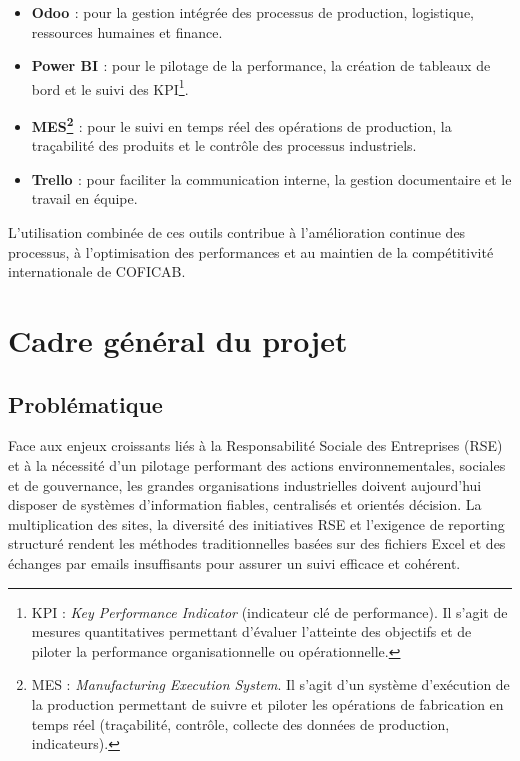 \begin{itemize}[label=\textbullet]
  \item \textbf{Odoo \cite{odoo-docs}} : pour la gestion intégrée des processus de production, logistique, ressources humaines et finance.
  \item \textbf{Power BI \cite{powerbi-docs}} : pour le pilotage de la performance, la création de tableaux de bord et le suivi des KPI\footnote{KPI : \emph{Key Performance Indicator} (indicateur clé de performance). Il s’agit de mesures quantitatives permettant d’évaluer l’atteinte des objectifs et de piloter la performance organisationnelle ou opérationnelle.}.
  \item \textbf{MES\footnote{MES : \emph{Manufacturing Execution System}. Il s’agit d’un système d’exécution de la production permettant de suivre et piloter les opérations de fabrication en temps réel (traçabilité, contrôle, collecte des données de production, indicateurs).} \cite{mes-docs}} : pour le suivi en temps réel des opérations de production, la traçabilité des produits et le contrôle des processus industriels.
  \item \textbf{Trello \cite{trello-docs}} : pour faciliter la communication interne, la gestion documentaire et le travail en équipe.
\end{itemize}
L’utilisation combinée de ces outils contribue à l’amélioration continue des processus, à l’optimisation des performances et au maintien de la compétitivité internationale de COFICAB.

\section{Cadre général du projet}

\subsection{Problématique}

Face aux enjeux croissants liés à la Responsabilité Sociale des Entreprises (RSE) et à la nécessité d’un pilotage performant des actions environnementales, sociales et de gouvernance, les grandes organisations industrielles doivent aujourd’hui disposer de systèmes d’information fiables, centralisés et orientés décision. La multiplication des sites, la diversité des initiatives RSE et l’exigence de reporting structuré rendent les méthodes traditionnelles basées sur des fichiers Excel et des échanges par emails insuffisants pour assurer un suivi efficace et cohérent.

